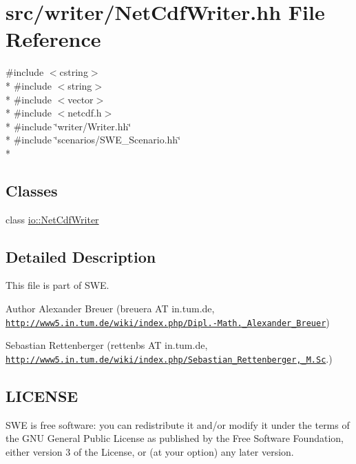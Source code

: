\hypertarget{NetCdfWriter_8hh}{\section{src/writer/\-Net\-Cdf\-Writer.hh File Reference}
\label{NetCdfWriter_8hh}
}
{\ttfamily \#include $<$cstring$>$}\\*
{\ttfamily \#include $<$string$>$}\\*
{\ttfamily \#include $<$vector$>$}\\*
{\ttfamily \#include $<$netcdf.\-h$>$}\\*
{\ttfamily \#include \char`\"{}writer/\-Writer.\-hh\char`\"{}}\\*
{\ttfamily \#include \char`\"{}scenarios/\-S\-W\-E\-\_\-\-Scenario.\-hh\char`\"{}}\\*
\subsection*{Classes}
\begin{DoxyCompactItemize}
\item 
class \hyperlink{classio_1_1NetCdfWriter}{io\-::\-Net\-Cdf\-Writer}
\end{DoxyCompactItemize}


\subsection{Detailed Description}
This file is part of S\-W\-E.

\begin{DoxyAuthor}{Author}
Alexander Breuer (breuera A\-T in.\-tum.\-de, \href{http://www5.in.tum.de/wiki/index.php/Dipl.-Math._Alexander_Breuer}{\tt http\-://www5.\-in.\-tum.\-de/wiki/index.\-php/\-Dipl.-\/\-Math.\-\_\-\-Alexander\-\_\-\-Breuer}) 

Sebastian Rettenberger (rettenbs A\-T in.\-tum.\-de, \href{http://www5.in.tum.de/wiki/index.php/Sebastian_Rettenberger,_M.Sc}{\tt http\-://www5.\-in.\-tum.\-de/wiki/index.\-php/\-Sebastian\-\_\-\-Rettenberger,\-\_\-\-M.\-Sc}.)
\end{DoxyAuthor}
\hypertarget{Writer_8hh_LICENSE}{}\subsection{L\-I\-C\-E\-N\-S\-E}\label{Writer_8hh_LICENSE}
S\-W\-E is free software\-: you can redistribute it and/or modify it under the terms of the G\-N\-U General Public License as published by the Free Software Foundation, either version 3 of the License, or (at your option) any later version.

